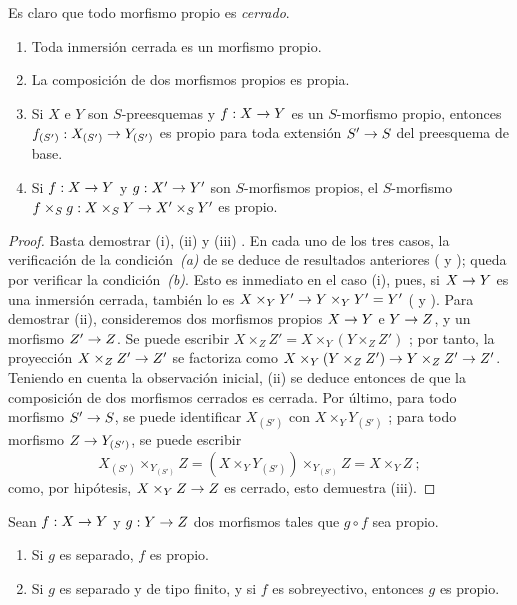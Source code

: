 \documentclass[oneside,10pt]{amsart}
\makeatletter
\newcommand{\ega@arrow}[2]{\mathchoice{#1}{#2}{#2}{#2}}
\renewcommand{\to}{\ega@arrow{\longrightarrow}{\rightarrow}}
\newcommand{\oldpage}[2][]{\marginnote{\normalfont\footnotesize\textbf{#1}~|~#2}\ignorespaces}
\let\EGAOriginalLabel\label
\renewcommand{\label}[1]{\phantomsection\EGAOriginalLabel{#1}}
\makeatother
\begin{document}
Es claro que todo morfismo propio es \emph{cerrado}.

\begin{proposition}[5.4.2]
\label{II.5.4.2-fr}
\medskip\noindent
\begin{enumerate}
  \item[{\rm(i)}] Toda inmersión cerrada es un morfismo propio.
  \item[{\rm(ii)}] La composición de dos morfismos propios es propia.
  \item[{\rm(iii)}] Si $X$ e $Y$ son $S$-preesquemas y $f:X\to Y$ es un $S$-morfismo propio, entonces $f_{(S')}:X_{(S')}\to Y_{(S')}$ es propio para toda extensión $S'\to S$ del preesquema de base.
  \item[{\rm(iv)}] Si $f:X\to Y$ y $g:X'\to Y'$ son $S$-morfismos propios, el $S$-morfismo $f\times_Sg:X\times_SY\to X'\times_SY'$ es propio.
\end{enumerate}
\end{proposition}

\oldpage[II]{101}
\begin{proof}
Basta demostrar (i), (ii) y (iii) .
En cada uno de los tres casos, la verificación de la condición~\emph{(a)} de  se deduce de resultados anteriores ( y ); queda por verificar la condición~\emph{(b)}.
Esto es inmediato en el caso (i), pues, si $X\to Y$ es una inmersión cerrada, también lo es $X\times_YY'\to Y\times_YY'=Y'$ ( y ).
Para demostrar (ii), consideremos dos morfismos propios $X\to Y$ e $Y\to Z$, y un morfismo $Z'\to Z$.
Se puede escribir $X\times_ZZ'=X\times_Y(Y\times_ZZ')$ ; por tanto, la proyección $X\times_ZZ'\to Z'$ se factoriza como $X\times_Y(Y\times_ZZ')\to Y\times_ZZ'\to Z'$.
Teniendo en cuenta la observación inicial, (ii) se deduce entonces de que la composición de dos morfismos cerrados es cerrada.
Por último, para todo morfismo $S'\to S$, se puede identificar $X_{(S')}$ con $X\times_YY_{(S')}$ ; para todo morfismo $Z\to Y_{(S')}$, se puede escribir
\[
  X_{(S')}\times_{Y_{(S')}}Z
  =(X\times_YY_{(S')})\times_{Y_{(S')}}Z=X\times_YZ~;
\]
como, por hipótesis, $X\times_YZ\to Z$ es cerrado, esto demuestra (iii).
\end{proof}

\begin{corollary}[5.4.3]
\label{II.5.4.3-fr}
Sean $f:X\to Y$ y $g:Y\to Z$ dos morfismos tales que $g\circ f$ sea propio.
\begin{enumerate}
  \item[{\rm(i)}] Si $g$ es separado, $f$ es propio.
  \item[{\rm(ii)}] Si $g$ es separado y de tipo finito, y si $f$ es sobreyectivo, entonces $g$ es propio.
\end{enumerate}
\end{corollary}
\end{document}
